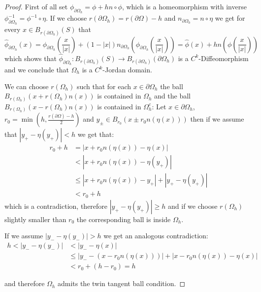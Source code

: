 \documentclass[11pt,a4paper,leqno]{report}
\numberwithin{equation}{chapter}
\begin{document}
\begin{proof} 
First of all set $\phi_{\partial\Omega_h}=\phi+hn\circ\phi$, which is a homeomorphism with inverse $\phi_{\partial\Omega_h}^{-1}=\phi^{-1}\circ\eta$. If we choose $r(\partial\Omega_h)=r(\partial\Omega)-h$ and $n_{\partial\Omega_h}=n\circ\eta$ we get for every $x\in B_{r(\partial\Omega_h)}(S)$ that
\begin{equation*}\hat{\phi}_{\partial\Omega_h}(x)=\phi_{\partial\Omega_h}(\frac{x}{|x|}) +(1-|x|)n_{\partial\Omega_h}(\phi_{\partial\Omega_h}(\frac{x}{|x|}))=\hat{\phi}(x)+hn(\phi(\frac{x}{|x|}))\end{equation*}
which shows that $\hat{\phi}_{\partial\Omega_h}:B_{r(\partial\Omega_h)}(S)\rightarrow B_{r(\partial\Omega_h)}(\partial\Omega_h)$ is a $C^k$-Diffeomorphism and we conclude that $\Omega_h$ is a $C^k$-Jordan domain.

We can choose $r(\Omega_h)$ such that for each $x\in\partial\Omega_h$ the ball $B_{r(\Omega_h)}(x+r(\Omega_h)n(x))$ is contained in $\Omega_h$ and the ball $B_{r(\Omega_h)}(x-r(\Omega_h)n(x))$ is contained in $\Omega_h^c$: 
Let $x\in\partial\Omega_h$, $r_0=\min(h,\frac{r(\partial\Omega)-h}{2})$ and $y_\pm\in B_{r_0}(x\pm r_0n(\eta(x)))$ then if we assume that $|y_+-\eta(y_+)|<h$ we get that:
\begin{align*}r_0+h&=|x+r_0n(\eta(x))-\eta(x)|\\
&<|x+r_0n(\eta(x))-\eta(y_+)|\\
&\leq |x+r_0n(\eta(x))-y_+|+|y_+-\eta(y_+)|\\
&< r_0+h\end{align*}
which is a contradiction, therefore $|y_+-\eta(y_+)|\geq h$ and if we choose $r(\Omega_h)$ slightly smaller than $r_0$ the corresponding ball is inside $\Omega_h$.

If we assume $|y_--\eta(y_-)|>h$ we get an analogous contradiction:
\begin{align*} h<|y_--\eta(y_-)|&<|y_--\eta(x)|\\
&\leq|y_--(x-r_0n(\eta(x)))|+|x-r_0n(\eta(x))-\eta(x)|\\
&<r_0+ (h-r_0)=h\end{align*}

and therefore $\Omega_h$ admits the twin tangent ball condition.
\end{proof}
\end{document}
